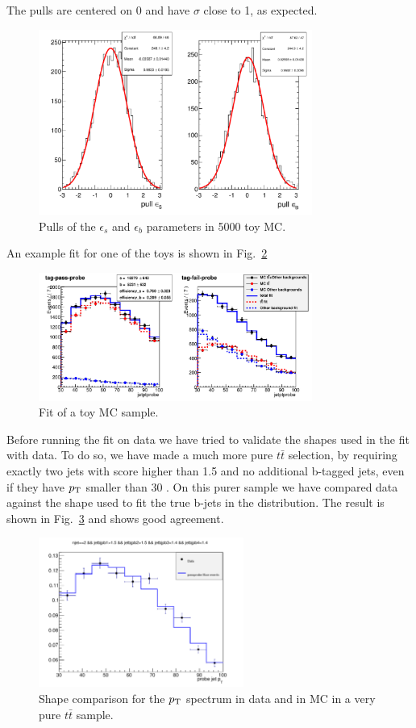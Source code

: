 The pulls are centered on 0 and have $\sigma$ close to 1, as expected.

\begin{figure}[t]
\centering
\includegraphics[width=0.8\textwidth]{images/pulls_mc.pdf}
\caption{Pulls of the $\epsilon_{s}$ and $\epsilon_{b}$ parameters in 5000 toy MC.\label{fig:pullstp}}
\end{figure}
An example fit for one of the toys is shown in  Fig.~\ref{fig:toy_tp}
\begin{figure}[b]
\centering
\includegraphics[width=0.8\textwidth]{images/mc_pt_probe_toy.pdf}
\caption{Fit of a toy MC sample.\label{fig:toy_tp}}
\end{figure}

Before running the fit on data we have tried to validate the shapes used in the fit with data. To do so, we have made a much more pure $t\bar{t}$ selection, by requiring exactly two jets with \jpb score higher than 1.5 and no additional b-tagged jets, even if they have $p_\mathrm{T}$ smaller than 30 \GeV. On this purer sample we have compared data against the shape used to fit the true b-jets in the \tpp{} distribution. The result is shown in Fig.~\ref{fig:purett} and shows good agreement.
\begin{figure}[t]
\centering
\includegraphics[width=0.6\textwidth]{images/passprobe_data_mc.pdf}
\caption{Shape comparison for the \probe{} $p_\mathrm{T}$ spectrum in data and in MC in a very pure $t\bar{t}$ sample.\label{fig:purett}}
\end{figure}

